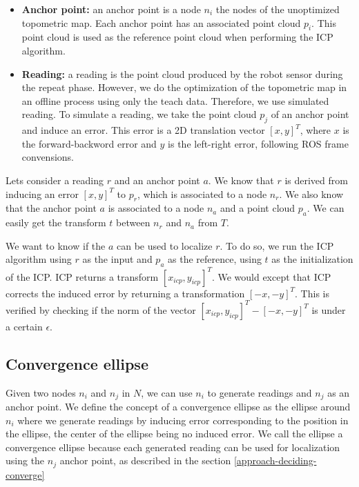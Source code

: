 \documentclass[letterpaper,10 pt,conference]{ieeeconf}
\begin{document}
\begin{itemize}
  \item \textbf{Anchor point:} an anchor point is a node $n_i$ the nodes of the unoptimized topometric map. Each
    anchor point has an associated point cloud $p_i$. This point cloud is used as the reference point cloud when performing the
    ICP algorithm.
  \item \textbf{Reading:} a reading is the point cloud produced by the robot sensor during the repeat phase. However,
    we do the optimization of the topometric map in an offline process using only the teach data. Therefore,
    we use simulated reading. To simulate a reading, we take the point cloud $p_j$ of an anchor point and induce an
    error. This error is a 2D translation vector $[x, y]^T$, where $x$ is the forward-backword error and $y$ is the left-right error,
    following ROS frame convensions.
\end{itemize}

Lets consider a reading $r$ and an anchor point $a$. We know that $r$ is derived from inducing an error $[x, y]^T$ to $p_r$, which is associated to a node $n_r$.
We also know that the anchor point $a$ is associated to a node $n_a$ and a point cloud $p_a$. We can easily get the transform $t$ between $n_r$ and $n_a$ from $T$.


We want to know if the $a$ can be used to localize $r$. To do so, we run the ICP algorithm using $r$ as the input and $p_a$ as the reference, using $t$
as the initialization of the ICP. ICP returns a transform $[x_{icp}, y_{icp}]^T$. We would except that ICP corrects the induced error by returning
a transformation $[-x, -y]^T$. This is verified by checking if the norm of the vector $[x_{icp}, y_{icp}]^T - [-x, -y]^T$ is under a certain $\epsilon$.


\subsection{Convergence ellipse}
Given two nodes $n_i$ and $n_j$ in $N$, we can use $n_i$ to generate readings and $n_j$ as an anchor point.
We define the concept of a convergence ellipse as the ellipse around $n_i$ where we generate readings by inducing
error corresponding to the position in the ellipse, the center of the ellipse being no induced error. We call the ellipse
a convergence ellipse because each generated reading can be used for localization using the $n_j$ anchor point, as described in the
section \ref{approach-deciding-converge}
\end{document}
